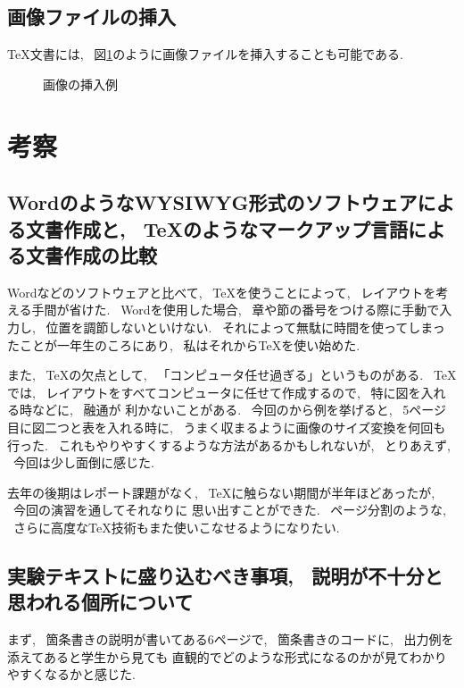 \documentclass[titlepage]{jarticle}
\begin{document}
	\subsection{画像ファイルの挿入}
		{\TeX}文書には, ~図\ref{fig:画像の挿入例}のように画像ファイルを挿入することも可能である.


		\begin{figure}[h]
			\caption{画像の挿入例} \label{fig:画像の挿入例}
		\end{figure}

\section{考察}
	\subsection{WordのようなWYSIWYG形式のソフトウェアによる文書作成と,
				~{\TeX}のようなマークアップ言語による文書作成の比較}
		Wordなどのソフトウェアと比べて, ~{\TeX}を使うことによって, ~レイアウトを考える手間が省けた.
		~Wordを使用した場合, ~章や節の番号をつける際に手動で入力し, ~位置を調節しないといけない.
		~それによって無駄に時間を使ってしまったことが一年生のころにあり, ~私はそれから{\TeX}を使い始めた.

		また, ~{\TeX}の欠点として, ~「コンピュータ任せ過ぎる」というものがある.
		~{\TeX}では, ~レイアウトをすべてコンピュータに任せて作成するので, ~特に図を入れる時などに, ~融通が
		利かないことがある. ~今回のから例を挙げると, ~5ページ目に図二つと表を入れる時に,
		~うまく収まるように画像のサイズ変換を何回も行った. ~これもやりやすくするような方法があるかもしれないが,
		~とりあえず, ~今回は少し面倒に感じた.

		去年の後期はレポート課題がなく, ~{\TeX}に触らない期間が半年ほどあったが, ~今回の演習を通してそれなりに
		思い出すことができた. ~ページ分割のような, ~さらに高度な{\TeX}技術もまた使いこなせるようになりたい.


	\subsection{実験テキストに盛り込むべき事項, ~説明が不十分と思われる個所について}
		まず, ~箇条書きの説明が書いてある6ページで, ~箇条書きのコードに, ~出力例を添えてあると学生から見ても
		直観的でどのような形式になるのかが見てわかりやすくなるかと感じた.
\end{document}

